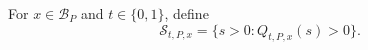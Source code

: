 For \(x\in\mathcal B_P\) and \(t\in\{0,1\}\), define
\[
 \mathcal S_{t,P,x}=\{s>0:Q_{t,P,x}(s)>0\}.
\]